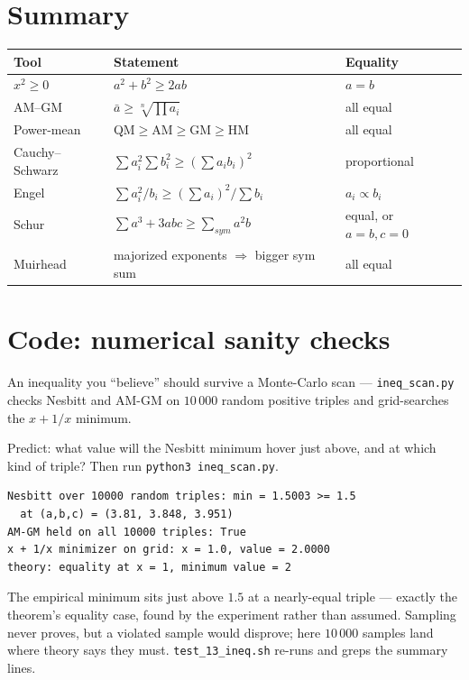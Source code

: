 \section{Summary}

\begin{center}\small
\begin{tabular}{@{}lll@{}}
\toprule
\textbf{Tool} & \textbf{Statement} & \textbf{Equality} \\
\midrule
$x^2\ge0$ & $a^2+b^2\ge2ab$ & $a=b$ \\
AM--GM & $\bar a \ge \sqrt[n]{\prod a_i}$ & all equal \\
Power-mean & QM$\ge$AM$\ge$GM$\ge$HM & all equal \\
Cauchy--Schwarz & $\sum a_i^2\sum b_i^2 \ge (\sum a_ib_i)^2$ & proportional \\
Engel & $\sum a_i^2/b_i \ge (\sum a_i)^2/\sum b_i$ & $a_i \propto b_i$ \\
Schur & $\sum a^3 + 3abc \ge \sum_{sym}a^2b$ & equal, or $a=b,c=0$ \\
Muirhead & majorized exponents $\Rightarrow$ bigger sym sum & all equal \\
\bottomrule
\end{tabular}
\end{center}

\section{Code: numerical sanity checks}

An inequality you ``believe'' should survive a Monte-Carlo scan ---
\texttt{ineq\_scan.py} checks Nesbitt and AM-GM on $10\,000$ random
positive triples and grid-searches the $x+1/x$ minimum.
\begin{checkpoint}
Predict: what value will the Nesbitt minimum hover just above, and at
which kind of triple? Then run \texttt{python3 ineq\_scan.py}.
\end{checkpoint}
\begin{lstlisting}
Nesbitt over 10000 random triples: min = 1.5003 >= 1.5
  at (a,b,c) = (3.81, 3.848, 3.951)
AM-GM held on all 10000 triples: True
x + 1/x minimizer on grid: x = 1.0, value = 2.0000
theory: equality at x = 1, minimum value = 2
\end{lstlisting}
The empirical minimum sits just above $1.5$ at a nearly-equal triple ---
exactly the theorem's equality case, found by the experiment rather than
assumed. Sampling never proves, but a violated sample would disprove;
here $10\,000$ samples land where theory says they must.
\texttt{test\_13\_ineq.sh} re-runs and greps the summary lines.

